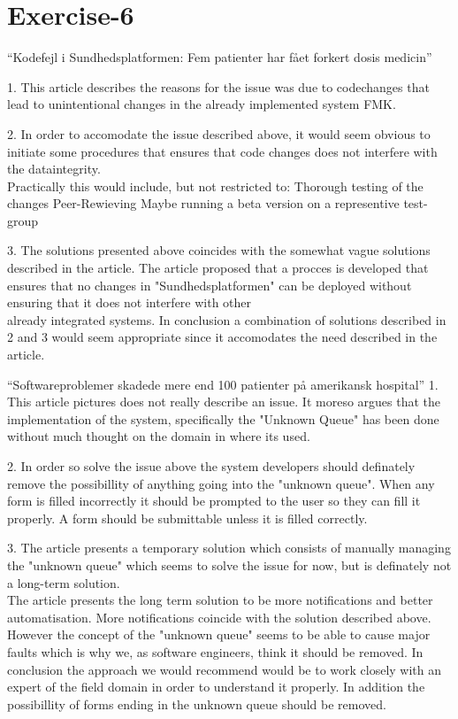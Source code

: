 \section{Exercise-6}

``Kodefejl i Sundhedsplatformen: Fem patienter har fået forkert dosis medicin''

1.
This article describes the reasons for the issue was due to codechanges
that lead to unintentional changes in the already implemented system FMK.

2. 
In order to accomodate the issue described above, it would seem obvious to initiate some procedures that ensures that code changes does not interfere with the dataintegrity.\\
Practically this would include, but not restricted to:
Thorough testing of the changes
Peer-Rewieving
Maybe running a beta version on a representive test-group

3.
The solutions presented above coincides with the somewhat vague solutions described in the article.
The article proposed that a procces is developed that ensures that no changes in "Sundhedsplatformen" can be deployed without ensuring that it does not interfere with other\\
already integrated systems.
In conclusion a combination of solutions described in 2 and 3 would seem appropriate since it accomodates the need described in the article.


``Softwareproblemer skadede mere end 100 patienter på amerikansk hospital''
1.
This article pictures does not really describe an issue.
It moreso argues that the implementation of the system, specifically the "Unknown Queue" has been done without much thought on the domain in where its used.

2.
In order so solve the issue above the system developers should definately remove the possibillity of anything going into the "unknown queue".
When any form is filled incorrectly it should be prompted to the user so they can fill it properly. A form should be submittable unless it is filled correctly.


3.
The article presents a temporary solution which consists of manually managing the "unknown queue" which seems to solve the issue for now, but is definately not a long-term solution.\\
The article presents the long term solution to be more notifications and better automatisation. More notifications coincide with the solution described above.\\
However the concept of the "unknown queue" seems to be able to cause major faults which is why we, as software engineers, think it should be removed.
In conclusion the approach we would recommend would be to work closely with an expert of the field domain in order to understand it properly.
In addition the possibillity of forms ending in the unknown queue should be removed.


